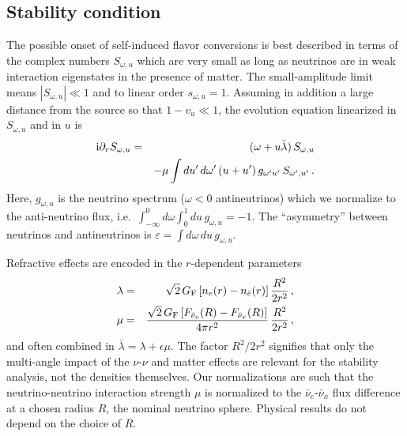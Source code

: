 \documentclass[twocolumn,prd,showpacs,
floatfix,preprintnumbers,nofootinbib]{revtex4}
\begin{document}
\subsection{Stability condition}

The possible onset of self-induced flavor conversions is best
described in terms of the complex numbers $S_{\omega,u}$ which are
very small as long as neutrinos are in weak interaction eigenstates
in the presence of matter. The small-amplitude limit means
$|S_{\omega,u}|\ll1$ and to linear order $s_{\omega,u}=1$. Assuming
in addition a large distance from the source so that $1-v_u\ll 1$,
the evolution equation linearized in $S_{\omega,u}$ and in $u$ is
\cite{Banerjee:2011fj}
\begin{eqnarray}\label{eq:smallEoM}
{\rm i}\partial_r S_{\omega,u}&=&
(\omega + u\bar\lambda)\,S_{\omega,u}
\nonumber\\
& &-\mu \int du'\,d\omega'\,(u+u')\,g_{\omega'u'}\,S_{\omega',u'}\,.
\label{stability-eom}
\end{eqnarray}
Here, $g_{\omega,u}$ is the neutrino spectrum ($\omega<0$
antineutrinos) which we normalize to the anti-neutrino flux, i.e.\
$\int_{-\infty}^0 d\omega\int_0^1 du\,g_{\omega,u}=-1$. The
``asymmetry'' between neutrinos and antineutrinos is
$\varepsilon=\int d\omega\, du\,g_{\omega,u}$.

Refractive effects are encoded in the $r$-dependent parameters
\begin{eqnarray}
\lambda&=&\sqrt{2}\,G_{\rm F}\,[n_e(r)-n_{\bar e}(r)]\,\frac{R^2}{2r^2}\,,
\nonumber\\
\mu&=&\frac{\sqrt{2}\,G_{\rm F}\,[F_{\bar\nu_e}(R)-F_{\bar\nu_x}(R)]}{4\pi r^2}
\,\frac{R^2}{2r^2}\,,
\end{eqnarray}
and often combined in $\bar{\lambda} = \lambda + \epsilon\mu$.
The factor $R^2/2r^2$ signifies that only the multi-angle impact of
the $\nu$-$\nu$ and matter effects are relevant for the stability
analysis, not the densities themselves. Our normalizations are such
that the neutrino-neutrino interaction strength $\mu$ is normalized
to the $\bar\nu_e$-$\bar\nu_x$ flux difference at a chosen radius
$R$, the nominal neutrino sphere. Physical results do not depend on
the choice of $R$.
\end{document}
